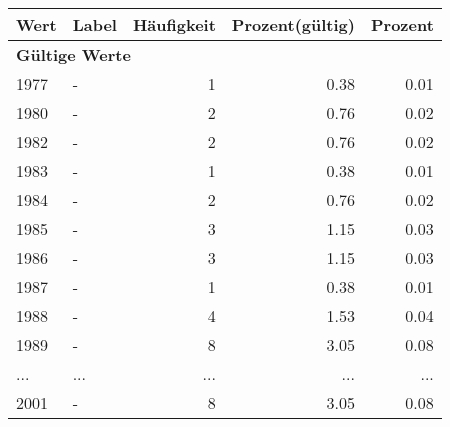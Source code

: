      \begin{longtable}{lXrrr}
     \toprule
     \textbf{Wert} & \textbf{Label} & \textbf{Häufigkeit} & \textbf{Prozent(gültig)} & \textbf{Prozent} \\
     \endhead
     \midrule
     \multicolumn{5}{l}{\textbf{Gültige Werte}}\\
        1977 & \multicolumn{1}{X}{-} & %
          \num{1} &
          \num[round-mode=places,round-precision=2]{0.38} &
          \num[round-mode=places,round-precision=2]{0.01} \\
        1980 & \multicolumn{1}{X}{-} & %
          \num{2} &
          \num[round-mode=places,round-precision=2]{0.76} &
          \num[round-mode=places,round-precision=2]{0.02} \\
        1982 & \multicolumn{1}{X}{-} & %
          \num{2} &
          \num[round-mode=places,round-precision=2]{0.76} &
          \num[round-mode=places,round-precision=2]{0.02} \\
        1983 & \multicolumn{1}{X}{-} & %
          \num{1} &
          \num[round-mode=places,round-precision=2]{0.38} &
          \num[round-mode=places,round-precision=2]{0.01} \\
        1984 & \multicolumn{1}{X}{-} & %
          \num{2} &
          \num[round-mode=places,round-precision=2]{0.76} &
          \num[round-mode=places,round-precision=2]{0.02} \\
        1985 & \multicolumn{1}{X}{-} & %
          \num{3} &
          \num[round-mode=places,round-precision=2]{1.15} &
          \num[round-mode=places,round-precision=2]{0.03} \\
        1986 & \multicolumn{1}{X}{-} & %
          \num{3} &
          \num[round-mode=places,round-precision=2]{1.15} &
          \num[round-mode=places,round-precision=2]{0.03} \\
        1987 & \multicolumn{1}{X}{-} & %
          \num{1} &
          \num[round-mode=places,round-precision=2]{0.38} &
          \num[round-mode=places,round-precision=2]{0.01} \\
        1988 & \multicolumn{1}{X}{-} & %
          \num{4} &
          \num[round-mode=places,round-precision=2]{1.53} &
          \num[round-mode=places,round-precision=2]{0.04} \\
        1989 & \multicolumn{1}{X}{-} & %
          \num{8} &
          \num[round-mode=places,round-precision=2]{3.05} &
          \num[round-mode=places,round-precision=2]{0.08} \\
       ... & ... & ... & ... & ... \\
        2001 & \multicolumn{1}{X}{-} & %
          \num{8} &
          \num[round-mode=places,round-precision=2]{3.05} &
          \num[round-mode=places,round-precision=2]{0.08} \\


\end{longtable}
